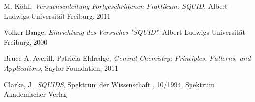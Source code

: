 \documentclass[12pt]{article}
\begin{document}
\newpage
\thispagestyle{empty}
\begin{thebibliography}{9}

  

  
  

M. Köhli,
\emph{Versuchsanleitung Fortgeschrittenen Praktikum: SQUID},
Albert-Ludwigs-Universität Freiburg,
2011

Volker Bange,
\emph{Einrichtung des Versuches "SQUID"},
Albert-Ludwigs-Universität Freiburg,
2000

Bruce A. Averill, Patricia Eldredge,
\emph{General Chemistry: Principles, Patterns, and Applications},
Saylor Foundation,
2011

Clarke, J.,
\emph{SQUIDS},
Spektrum der Wissenschaft , 10/1994,
Spektrum Akademischer Verlag
\end{thebibliography}
\end{document}
